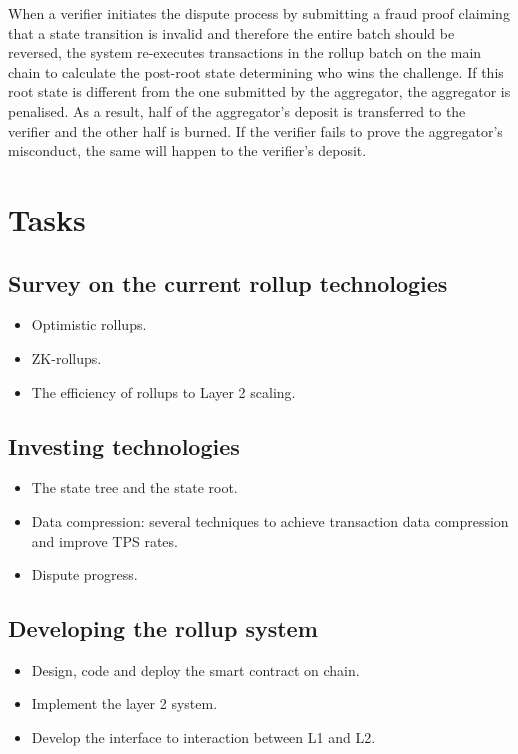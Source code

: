 \documentclass{article}
\begin{document}
When a verifier initiates the dispute process by submitting a fraud proof claiming that a state transition is invalid and therefore the entire batch should be reversed, the system  re-executes transactions in the rollup batch on the main chain to calculate the post-root state determining who wins the challenge.  If this root state is different from the one submitted by the aggregator, the aggregator is penalised. As a result, half of the aggregator's deposit is transferred to the verifier and the other half is burned. If the verifier fails to prove the aggregator's misconduct, the same will happen to the verifier's deposit.

\section{Tasks}
\subsection{Survey on the current rollup technologies}
\begin{itemize}
    \item Optimistic rollups.
    \item ZK-rollups.
    \item The efficiency of rollups to Layer 2 scaling.
\end{itemize}
\subsection{Investing technologies}
\begin{itemize}
    \item The state tree and the state root.
    \item Data compression: several techniques to achieve transaction data compression and improve TPS rates. 
    \item Dispute progress.
\end{itemize}
\subsection{Developing the rollup system}
\begin{itemize}
    \item Design, code and deploy the smart contract on chain.
    \item Implement the layer 2 system.
    \item Develop the interface to interaction between L1 and L2.
\end{itemize}
\end{document}
